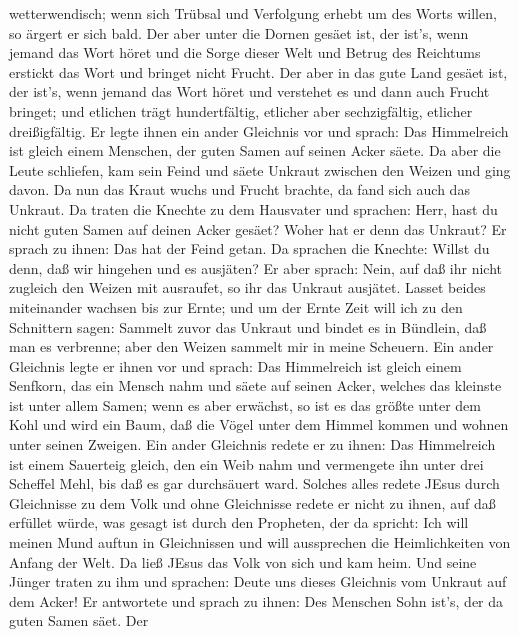 wetterwendisch; wenn sich Trübsal und Verfolgung erhebt um des Worts
willen, so ärgert er sich bald.  Der aber unter die Dornen
gesäet ist, der ist's, wenn jemand das Wort höret und die Sorge dieser
Welt und Betrug des Reichtums erstickt das Wort und bringet nicht
Frucht.  Der aber in das gute Land gesäet ist, der ist's,
wenn jemand das Wort höret und verstehet es und dann auch Frucht
bringet; und etlichen trägt hundertfältig, etlicher aber sechzigfältig,
etlicher dreißigfältig.  Er legte ihnen ein ander Gleichnis
vor und sprach: Das Himmelreich ist gleich einem Menschen, der guten
Samen auf seinen Acker säete.  Da aber die Leute schliefen,
kam sein Feind und säete Unkraut zwischen den Weizen und ging davon.
 Da nun das Kraut wuchs und Frucht brachte, da fand sich
auch das Unkraut.  Da traten die Knechte zu dem Hausvater
und sprachen: Herr, hast du nicht guten Samen auf deinen Acker gesäet?
Woher hat er denn das Unkraut?  Er sprach zu ihnen: Das hat
der Feind getan. Da sprachen die Knechte: Willst du denn, daß wir
hingehen und es ausjäten?  Er aber sprach: Nein, auf daß
ihr nicht zugleich den Weizen mit ausraufet, so ihr das Unkraut
ausjätet.  Lasset beides miteinander wachsen bis zur Ernte;
und um der Ernte Zeit will ich zu den Schnittern sagen: Sammelt zuvor
das Unkraut und bindet es in Bündlein, daß man es verbrenne; aber den
Weizen sammelt mir in meine Scheuern.  Ein ander Gleichnis
legte er ihnen vor und sprach: Das Himmelreich ist gleich einem
Senfkorn, das ein Mensch nahm und säete auf seinen Acker, 
welches das kleinste ist unter allem Samen; wenn es aber erwächst, so
ist es das größte unter dem Kohl und wird ein Baum, daß die Vögel unter
dem Himmel kommen und wohnen unter seinen Zweigen.  Ein
ander Gleichnis redete er zu ihnen: Das Himmelreich ist einem Sauerteig
gleich, den ein Weib nahm und vermengete ihn unter drei Scheffel Mehl,
bis daß es gar durchsäuert ward.  Solches alles redete
JEsus durch Gleichnisse zu dem Volk und ohne Gleichnisse redete er nicht
zu ihnen,  auf daß erfüllet würde, was gesagt ist durch den
Propheten, der da spricht: Ich will meinen Mund auftun in Gleichnissen
und will aussprechen die Heimlichkeiten von Anfang der Welt.
 Da ließ JEsus das Volk von sich und kam heim. Und seine
Jünger traten zu ihm und sprachen: Deute uns dieses Gleichnis vom
Unkraut auf dem Acker!  Er antwortete und sprach zu ihnen:
Des Menschen Sohn ist's, der da guten Samen säet.  Der
